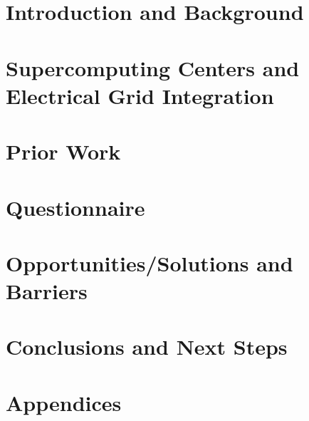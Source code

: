 \documentclass{llncs}
\begin{document}
%
\section{Introduction and Background}

\label{sec:intro}

\section{Supercomputing Centers and Electrical Grid Integration}

\label{sec:supercomputing}

\section{Prior Work}

\label{sec:priorwork}

\section{Questionnaire} 

\label{sec:questionaire}

\section{Opportunities/Solutions and Barriers} 

\label{sec:opportunities}

\section{Conclusions and Next Steps}

\label{sec:conclusion}

\newpage


%
%

%

\section{Appendices}

\label{sec:appendices}
\end{document}
